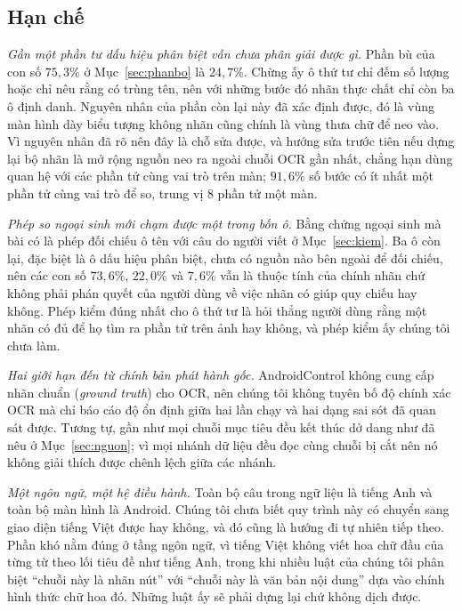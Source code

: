 \documentclass[12pt,a4paper,onecolumn]{article}
\newcommand{\ôvuông}[2]{\tikz[baseline=-0.45ex]{\draw[#1,line width=0.9pt,#2] (0,0) rectangle (0.34,0.18);}}
\begin{document}
\subsection{Hạn chế}

\emph{Gần một phần tư dấu hiệu phân biệt vẫn chưa phân giải được gì.} Phần bù của con số $75{,}3\%$ ở Mục~\ref{sec:phanbo} là $24{,}7\%$. Chừng ấy ô thứ tư chỉ
đếm số lượng hoặc chỉ nêu rằng có trùng tên, nên với những bước đó nhãn thực chất chỉ còn ba ô định danh. Nguyên nhân của phần còn lại này đã xác định được, đó là vùng màn hình dày biểu tượng
không nhãn cũng chính là vùng thưa chữ để neo vào. Vì nguyên nhân đã rõ nên đây là chỗ sửa được, và hướng sửa trước tiên nếu dựng lại bộ nhãn
là mở rộng nguồn neo ra ngoài chuỗi OCR gần nhất, chẳng hạn dùng quan hệ với các phần tử cùng vai trò
trên màn; $91{,}6\%$ số bước có ít nhất một phần tử cùng vai trò để so, trung vị $8$ phần
tử một màn.

\emph{Phép so ngoại sinh mới chạm được một trong bốn ô.} Bằng chứng ngoại sinh mà bài có
là phép đối chiếu ô tên với câu do người viết ở Mục~\ref{sec:kiem}. Ba ô còn lại, đặc biệt
là ô dấu hiệu phân biệt, chưa có nguồn nào bên ngoài để đối chiếu, nên các con số
$73{,}6\%$, $22{,}0\%$ và $7{,}6\%$ vẫn là thuộc tính của chính nhãn chứ không phải phán
quyết của người dùng về việc nhãn có giúp quy chiếu hay không. Phép kiểm đúng nhất cho ô
thứ tư là hỏi thẳng người dùng rằng một nhãn có đủ để họ tìm ra phần tử trên ảnh hay
không, và phép kiểm ấy chúng tôi chưa làm.

\emph{Hai giới hạn đến từ chính bản phát hành gốc.} AndroidControl không cung cấp nhãn
chuẩn (\emph{ground truth}) cho OCR, nên chúng tôi không tuyên bố độ chính xác OCR mà chỉ
báo cáo độ ổn định giữa hai lần chạy và hai dạng sai sót đã quan sát được. Tương tự, gần
như mọi chuỗi mục tiêu đều kết thúc dở dang như đã nêu ở Mục~\ref{sec:nguon}; vì mọi nhánh
dữ liệu đều đọc cùng chuỗi bị cắt nên nó không giải thích được chênh lệch giữa các nhánh.

\emph{Một ngôn ngữ, một hệ điều hành.} Toàn bộ câu trong ngữ liệu là tiếng Anh và toàn bộ
màn hình là Android. Chúng tôi chưa biết quy trình này có chuyển sang giao diện tiếng Việt được hay không, và
đó cũng là hướng đi tự nhiên tiếp theo. Phần khó nằm đúng ở tầng ngôn ngữ, vì tiếng Việt không viết hoa chữ đầu của từng từ theo
lối tiêu đề như tiếng Anh, trong khi nhiều luật của chúng tôi phân biệt ``chuỗi này là nhãn nút'' với ``chuỗi này là văn
bản nội dung'' dựa vào chính hình thức chữ hoa đó. Những luật ấy sẽ phải dựng lại chứ
không dịch được.
\end{document}
